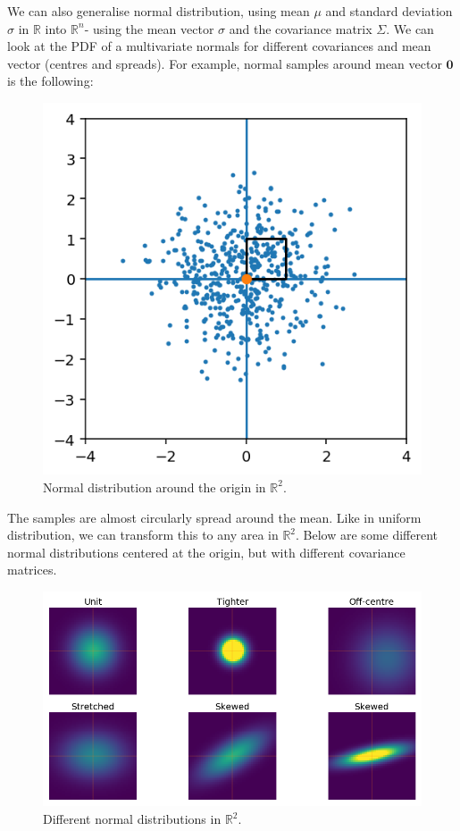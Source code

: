 \documentclass[a4paper, openany]{memoir}
\begin{document}
We can also generalise normal distribution, using mean $\mu$ and standard deviation $\sigma$ in $\mathbb{R}$ into $\mathbb{R}^n$- using the mean vector $\sigma$ and the covariance matrix $\Sigma$. We can look at the PDF of a multivariate normals for different covariances and mean vector (centres and spreads). For example, normal samples around mean vector $\mathbf{0}$ is the following:
\begin{figure}[H]
    \centering
    \includegraphics[scale=0.5]{src/5.21 normal spread.png}
    \caption{Normal distribution around the origin in $\mathbb{R}^2$.}
\end{figure}
\noindent The samples are almost circularly spread around the mean. Like in uniform distribution, we can transform this to any area in $\mathbb{R}^2$. Below are some different normal distributions centered at the origin, but with different covariance matrices.
\begin{figure}[H]
    \centering
    \includegraphics[scale=0.5]{src/5.22 normal distribution examples.png}
    \caption{Different normal distributions in $\mathbb{R}^2$.}
\end{figure}
\end{document}

